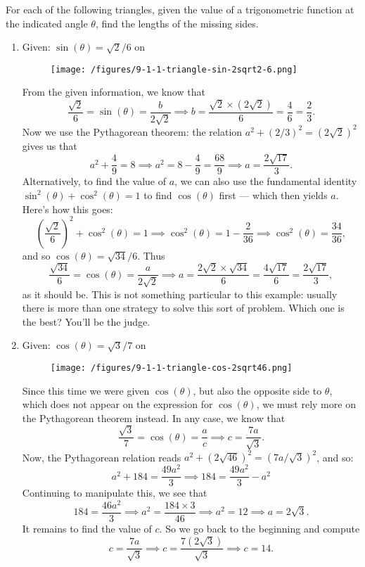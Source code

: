 \documentclass{ximera}
\begin{document}
\begin{example}For each of the following triangles, given the value of a trigonometric function at the indicated angle $\theta$, find the lengths of the missing sides.
  \begin{enumerate}[label=\alph*.]
  \item Given: $\sin(\theta) = \sqrt{2}/6$ on

    \begin{figure}[h]
      \centering
      \texttt{[image: /figures/9-1-1-triangle-sin-2sqrt2-6.png]}
    \end{figure}

    \begin{explanation}
 From the given information, we know that $$\frac{\sqrt{2}}{6} = \sin(\theta) = \frac{b}{2\sqrt{2}} \implies b = \frac{\sqrt{2}\times (2\sqrt{2})}{6} = \frac{4}{6} = \frac{2}{3}.$$Now we use the Pythagorean theorem: the relation $a^2 +(2/3)^2=(2\sqrt{2})^2$ gives us that $$a^2+\frac{4}{9} = 8 \implies a^2 = 8-\frac{4}{9} = \frac{68}{9} \implies a = \frac{2\sqrt{17}}{3}.$$Alternatively, to find the value of $a$, we can also use the fundamental identity $\sin^2(\theta)+\cos^2(\theta)=1$ to find $\cos(\theta)$ first --- which then yields $a$. Here's how this goes: $$ \left(\frac{\sqrt{2}}{6}\right)^2+\cos^2(\theta)=1 \implies \cos^2(\theta) = 1- \frac{2}{36} \implies \cos^2(\theta) = \frac{34}{36},$$and so $\cos(\theta) = \sqrt{34}/6$. Thus $$\frac{\sqrt{34}}{6} = \cos(\theta) = \frac{a}{2\sqrt{2}} \implies a = \frac{2\sqrt{2} \times \sqrt{34}}{6} = \frac{4\sqrt{17}}{6} = \frac{2\sqrt{17}}{3},$$as it should be. This is not something particular to this example: usually there is more than one strategy to solve this sort of problem. Which one is the best? You'll be the judge.
    \end{explanation}
    
  \item Given: $\cos(\theta) = \sqrt{3}/7$ on

    \begin{figure}[h]
      \centering
      \texttt{[image: /figures/9-1-1-triangle-cos-2sqrt46.png]}
    \end{figure}

    \begin{explanation}
      Since this time we were given $\cos(\theta)$, but also the opposite side to $\theta$, which does not appear on the expression for $\cos(\theta)$, we must rely more on the Pythagorean theorem instead. In any case, we know that $$\frac{\sqrt{3}}{7}= \cos(\theta)=\frac{a}{c}  \implies c = \frac{7a}{\sqrt{3}}. $$Now, the Pythagorean relation reads $a^2 + (2\sqrt{46})^2 = (7a/\sqrt{3})^2$, and so: $$a^2 + 184 = \frac{49a^2}{3} \implies 184 = \frac{49a^2}{3}-a^2$$Continuing to manipulate this, we see that $$184 = \frac{46a^2}{3} \implies a^2 = \frac{184 \times 3}{46} \implies a^2 = 12 \implies a = 2\sqrt{3}.$$It remains to find the value of $c$. So we go back to the beginning and compute $$c = \frac{7a}{\sqrt{3}}\implies c = \frac{7(2\sqrt{3})}{\sqrt{3}} \implies c=14.$$
    \end{explanation}
    

\end{enumerate}
\end{example}
\end{document}
